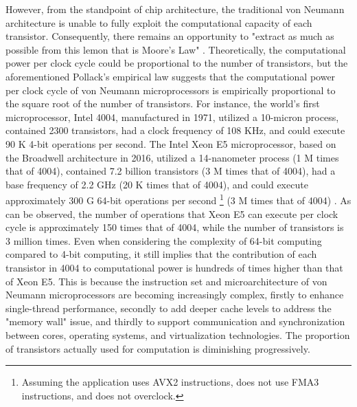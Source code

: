 However, from the standpoint of chip architecture, the traditional von Neumann architecture is unable to fully exploit the computational capacity of each transistor. Consequently, there remains an opportunity to "extract as much as possible from this lemon that is Moore's Law" \cite{threebody}. Theoretically, the computational power per clock cycle could be proportional to the number of transistors, but the aforementioned Pollack's empirical law \cite{pollackpollack} suggests that the computational power per clock cycle of von Neumann microprocessors is empirically proportional to the square root of the number of transistors. For instance, the world's first microprocessor, Intel 4004, manufactured in 1971, utilized a 10-micron process, contained 2300 transistors, had a clock frequency of 108 KHz, and could execute 90 K 4-bit operations per second. The Intel Xeon E5 microprocessor, based on the Broadwell architecture in 2016, utilized a 14-nanometer process (1 M times that of 4004), contained 7.2 billion transistors (3 M times that of 4004), had a base frequency of 2.2 GHz (20 K times that of 4004), and could execute approximately 300 G 64-bit operations per second \footnote{Assuming the application uses AVX2 instructions, does not use FMA3 instructions, and does not overclock.} (3 M times that of 4004) \cite{intel-e5-v4}. As can be observed, the number of operations that Xeon E5 can execute per clock cycle is approximately 150 times that of 4004, while the number of transistors is 3 million times. Even when considering the complexity of 64-bit computing compared to 4-bit computing, it still implies that the contribution of each transistor in 4004 to computational power is hundreds of times higher than that of Xeon E5. This is because the instruction set and microarchitecture of von Neumann microprocessors are becoming increasingly complex, firstly to enhance single-thread performance, secondly to add deeper cache levels to address the "memory wall" issue, and thirdly to support communication and synchronization between cores, operating systems, and virtualization technologies. The proportion of transistors actually used for computation is diminishing progressively.

